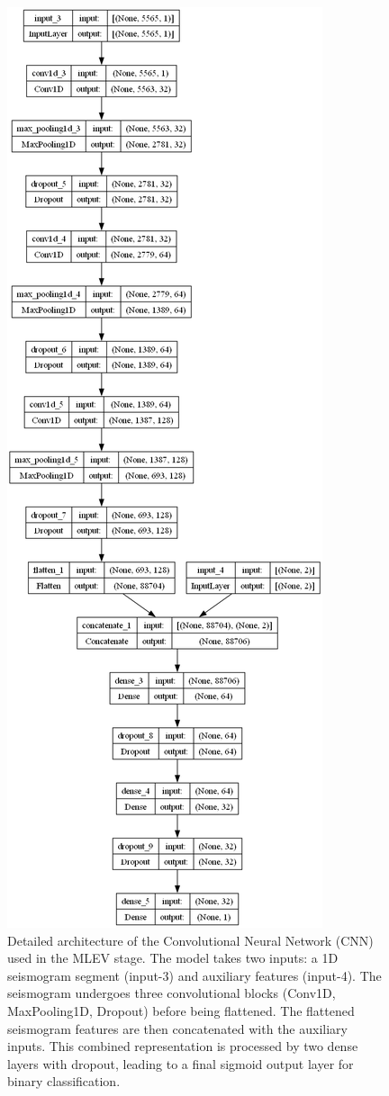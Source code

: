 \documentclass[conference]{IEEEtran}
\begin{document}
            \begin{figure}[htbp]
                \centerline{\includegraphics[width=0.7\columnwidth]{figures/CNN_Figure.png}}
                \caption{Detailed architecture of the Convolutional Neural Network (CNN) used in the MLEV stage. 
                The model takes two inputs: a 1D seismogram segment (input-3) and auxiliary features (input-4). 
                The seismogram undergoes three convolutional blocks (Conv1D, MaxPooling1D, Dropout) before being 
                flattened. The flattened seismogram features are then concatenated with the auxiliary inputs. 
                This combined representation is processed by two dense layers with dropout, leading to a final sigmoid output layer for binary classification.}
                \label{fig:cnn_architecture_diagram}
            \end{figure}
        
\end{document}
